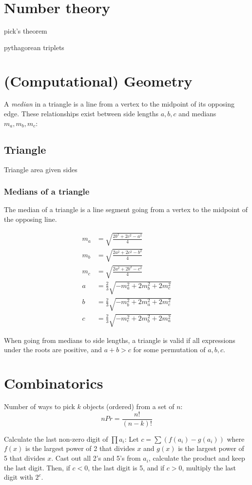 \documentclass[a4paper,11pt]{article}
\begin{document}
\section{Number theory}

pick's theorem

pythagorean triplets


\section{(Computational) Geometry}

A \emph{median} in a triangle is a line from a vertex to the midpoint of its opposing edge. These relationships exist between side lengths $a,b,c$ and medians $m_a,m_b,m_c$:

\subsection{Triangle}

Triangle area given sides

\subsubsection{Medians of a triangle}

The median of a triangle is a line segment going from a vertex to the midpoint of the opposing line.

\begin{align*}
	m_a &= \sqrt{\frac{2b^2+2c^2-a^2}{4}}\\
	m_b &= \sqrt{\frac{2a^2+2c^2-b^2}{4}}\\
	m_c &= \sqrt{\frac{2a^2+2b^2-c^2}{4}}\\
	a &= \frac{2}{3}\sqrt{-m_a^2 + 2m_b^2 + 2m_c^2} \\
	b &= \frac{2}{3}\sqrt{-m_b^2 + 2m_a^2 + 2m_c^2} \\
	c &= \frac{2}{3}\sqrt{-m_c^2 + 2m_b^2 + 2m_a^2}
\end{align*}

When going from medians to side lengths, a triangle is valid if all expressions under the roots are positive, and $a+b>c$ for some permutation of $a,b,c$.

\section{Combinatorics}

Number of ways to pick $k$ objects (ordered) from a set of $n$: $$n P r = \frac{n!}{(n-k)!}$$

Calculate the last non-zero digit of $\prod a_i$: Let $c=\sum (f(a_i)-g(a_i))$ where $f(x)$ is the largest power of 2 that divides $x$ and $g(x)$ is the largest power of 5 that divides $x$. Cast out all 2's and 5's from $a_i$, calculate the product and keep the last digit. Then, if $c<0$, the last digit is 5, and if $c>0$, multiply the last digit with $2^c$.
\end{document}
